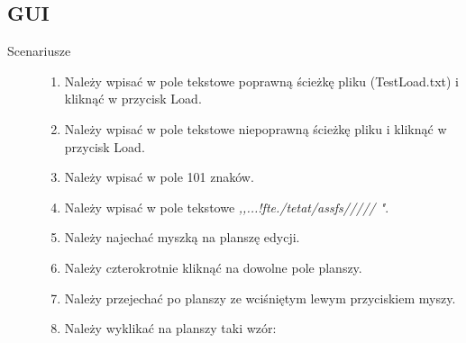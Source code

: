 \documentclass[a4paper,11pt]{article}
\begin{document}
\subsection{GUI}
\begin{description}

\item[Scenariusze] \hfill

\begin{enumerate}
\item Należy wpisać w pole tekstowe poprawną ścieżkę pliku (TestLoad.txt) i kliknąć w przycisk Load.
\item Należy wpisać w pole tekstowe niepoprawną ścieżkę pliku i kliknąć w przycisk Load.
\item Należy wpisać w pole 101 znaków.
\item Należy wpisać w pole tekstowe \textit{,,...!fte./tetat/assfs/////     "}.
\item Należy najechać myszką na planszę edycji.
\item Należy czterokrotnie kliknąć na dowolne pole planszy.
\item Należy przejechać po planszy ze wciśniętym lewym przyciskiem myszy.
\item Należy wyklikać na planszy taki wzór:


\end{enumerate}
\end{description}
\end{document}
